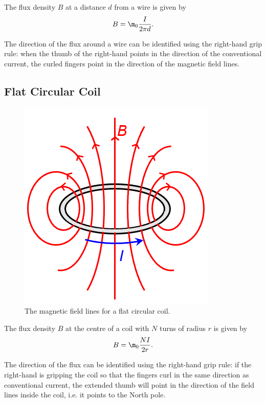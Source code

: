 \begin{proposition}
    The flux density $B$ at a distance $d$ from a wire is given by \[B = \m_0 \frac{I}{2\pi d}.\]
\end{proposition}

The direction of the flux around a wire can be identified using the right-hand grip rule: when the thumb of the right-hand points in the direction of the conventional current, the curled fingers point in the direction of the magnetic field lines.

\subsection{Flat Circular Coil}

\begin{figure}[H]
    \centering
    \includegraphics{media/Magnetic Field Lines - Flat Coil.png}
    \caption{The magnetic field lines for a flat circular coil.\protect\footnotemark[1]}
\end{figure}

\begin{proposition}
    The flux density $B$ at the centre of a coil with $N$ turns of radius $r$ is given by \[B = \m_0 \frac{NI}{2r}.\]
\end{proposition}

The direction of the flux can be identified using the right-hand grip rule: if the right-hand is gripping the coil so that the fingers curl in the same direction as conventional current, the extended thumb will point in the direction of the field lines inside the coil, i.e. it points to the North pole.

